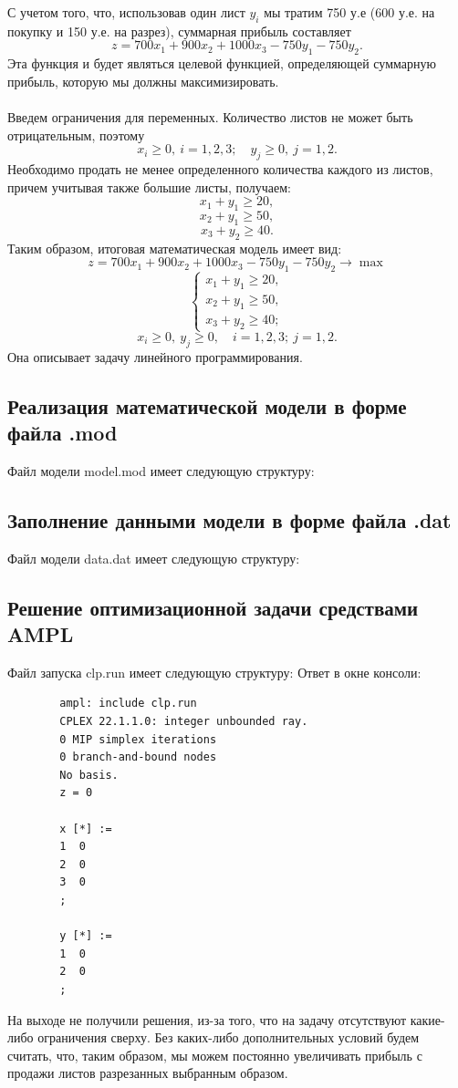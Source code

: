 \documentclass[a4paper, 12pt]{report}
\renewcommand{\geq}{\geqslant}
\begin{document}
	С учетом того, что, использовав один лист $y_i$ мы тратим 750 у.е (600 у.е. на покупку и 150 у.е. на разрез), 
	суммарная прибыль составляет $$z = 700x_1 + 900x_2 + 1000x_3 - 750y_1 - 750 y_2.$$
	Эта функция и будет являться целевой функцией, определяющей суммарную прибыль, которую мы должны максимизировать.\\\\
	Введем ограничения для переменных. Количество листов не может быть отрицательным, поэтому $$x_i \geq 0,\ i=1,2,3;\quad y_j \geq 0,\ j=1,2.$$
	Необходимо продать не менее определенного количества каждого из листов, причем учитывая также большие листы, получаем:
	$$x_1 + y_1 \geq 20,$$
	$$x_2 + y_1 \geq 50,$$
	$$x_3 + y_2 \geq 40.$$
	Таким образом, итоговая математическая модель имеет вид:
	$$z = 700x_1 + 900x_2 + 1000x_3 - 750y_1 - 750 y_2\to \max$$
	$$\begin{cases}
		x_1 + y_1 \geq 20,\\
		x_2 + y_1 \geq 50,\\
		x_3 + y_2 \geq 40;
	\end{cases}$$
	$$x_i \geq 0,\ y_j \geq 0,\quad i=1,2,3;\ j=1,2.$$
	Она описывает задачу линейного программирования.
	\subsection*{Реализация математической модели в форме файла .mod}
	Файл модели model.mod имеет следующую структуру:
	\subsection*{Заполнение данными модели в форме файла .dat}
	Файл модели data.dat имеет следующую структуру:
	\subsection*{Решение оптимизационной задачи средствами AMPL}
	Файл запуска clp.run имеет следующую структуру:
	Ответ в окне консоли:
	\begin{verbatim}
		ampl: include clp.run
		CPLEX 22.1.1.0: integer unbounded ray.
		0 MIP simplex iterations
		0 branch-and-bound nodes
		No basis.
		z = 0
		
		x [*] :=
		1  0
		2  0
		3  0
		;
		
		y [*] :=
		1  0
		2  0
		;
	\end{verbatim}
	На выходе не получили решения, из-за того, что на задачу отсутствуют какие-либо ограничения сверху. Без каких-либо дополнительных условий будем считать, что, таким образом, мы можем постоянно увеличивать прибыль с продажи листов разрезанных выбранным образом.
\end{document}
